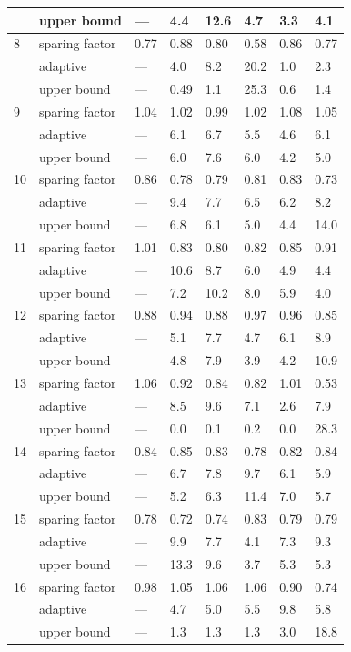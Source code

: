 \documentclass[11pt]{article}
\newcommand{\midrule}{\hline}
\newcommand{\bottomrule}{\hline}
\begin{document}
\begin{longtable}{llllllll}
  & upper bound & --- & 4.4 & 12.6 & 4.7 & 3.3 & 4.1 \\
\midrule
8 & sparing factor & 0.77 & 0.88 & 0.80 & 0.58 & 0.86 & 0.77 \\
  & adaptive & --- & 4.0 & 8.2 & 20.2 & 1.0 & 2.3 \\
  & upper bound & --- & 0.49 & 1.1 & 25.3 & 0.6 & 1.4 \\
\midrule
9 & sparing factor & 1.04 & 1.02 & 0.99 & 1.02 & 1.08 & 1.05 \\
  & adaptive & --- & 6.1 & 6.7 & 5.5 & 4.6 & 6.1 \\
  & upper bound & --- & 6.0 & 7.6 & 6.0 & 4.2 & 5.0 \\
\midrule
10 & sparing factor & 0.86 & 0.78 & 0.79 & 0.81 & 0.83 & 0.73 \\
   & adaptive & --- & 9.4 & 7.7 & 6.5 & 6.2 & 8.2 \\
   & upper bound & --- & 6.8 & 6.1 & 5.0 & 4.4 & 14.0 \\
\midrule
11 & sparing factor & 1.01 & 0.83 & 0.80 & 0.82 & 0.85 & 0.91 \\
   & adaptive & --- & 10.6 & 8.7 & 6.0 & 4.9 & 4.4 \\
   & upper bound & --- & 7.2 & 10.2 & 8.0 & 5.9 & 4.0 \\
\midrule
12 & sparing factor & 0.88 & 0.94 & 0.88 & 0.97 & 0.96 & 0.85 \\
   & adaptive & --- & 5.1 & 7.7 & 4.7 & 6.1 & 8.9 \\
   & upper bound & --- & 4.8 & 7.9 & 3.9 & 4.2 & 10.9 \\
\midrule
13 & sparing factor & 1.06 & 0.92 & 0.84 & 0.82 & 1.01 & 0.53 \\
   & adaptive & --- & 8.5 & 9.6 & 7.1 & 2.6 & 7.9 \\
   & upper bound & --- & 0.0 & 0.1 & 0.2 & 0.0 & 28.3 \\
\midrule
14 & sparing factor & 0.84 & 0.85 & 0.83 & 0.78 & 0.82 & 0.84 \\
   & adaptive & --- & 6.7 & 7.8 & 9.7 & 6.1 & 5.9 \\
   & upper bound & --- & 5.2 & 6.3 & 11.4 & 7.0 & 5.7 \\
\midrule
15 & sparing factor & 0.78 & 0.72 & 0.74 & 0.83 & 0.79 & 0.79 \\
   & adaptive & --- & 9.9 & 7.7 & 4.1 & 7.3 & 9.3 \\
   & upper bound & --- & 13.3 & 9.6 & 3.7 & 5.3 & 5.3 \\
\midrule
16 & sparing factor & 0.98 & 1.05 & 1.06 & 1.06 & 0.90 & 0.74 \\
   & adaptive & --- & 4.7 & 5.0 & 5.5 & 9.8 & 5.8 \\
   & upper bound & --- & 1.3 & 1.3 & 1.3 & 3.0 & 18.8 \\
\bottomrule
\end{longtable}
\normalsize
\end{document}
